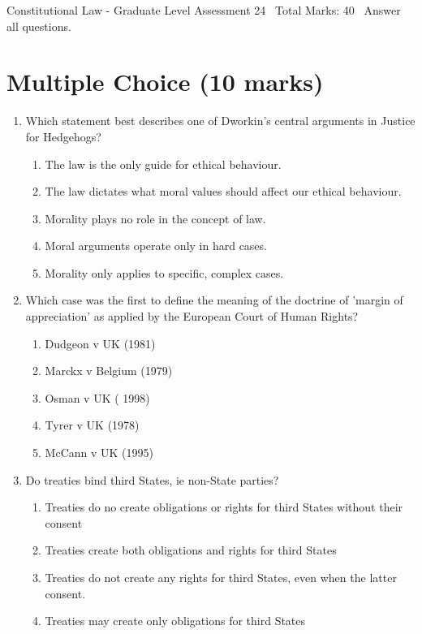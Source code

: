 \documentclass[12pt]{article}
\begin{document}
\begin{center}
Constitutional Law - Graduate Level Assessment 24 \
Total Marks: 40 \
Answer all questions.
\end{center}

\section*{Multiple Choice (10 marks)}
\begin{enumerate}[label=\arabic*.]
\item Which statement best describes one of Dworkin's central arguments in Justice for Hedgehogs?
\begin{enumerate}[label=(\alph*)]
    \item The law is the only guide for ethical behaviour.
    \item The law dictates what moral values should affect our ethical behaviour.
    \item Morality plays no role in the concept of law.
    \item Moral arguments operate only in hard cases.
    \item Morality only applies to specific, complex cases.
\end{enumerate}
\item Which case was the first to define the meaning of the doctrine of 'margin of appreciation' as applied by the European Court of Human Rights?
\begin{enumerate}[label=(\alph*)]
    \item Dudgeon v UK (1981)
    \item Marckx v Belgium (1979)
    \item Osman v UK ( 1998)
    \item Tyrer v UK (1978)
    \item McCann v UK (1995)
\end{enumerate}
\item Do treaties bind third States, ie non-State parties?
\begin{enumerate}[label=(\alph*)]
    \item Treaties do no create obligations or rights for third States without their consent
    \item Treaties create both obligations and rights for third States
    \item Treaties do not create any rights for third States, even when the latter consent.
    \item Treaties may create only obligations for third States

\end{enumerate}
\end{enumerate}
\end{document}
